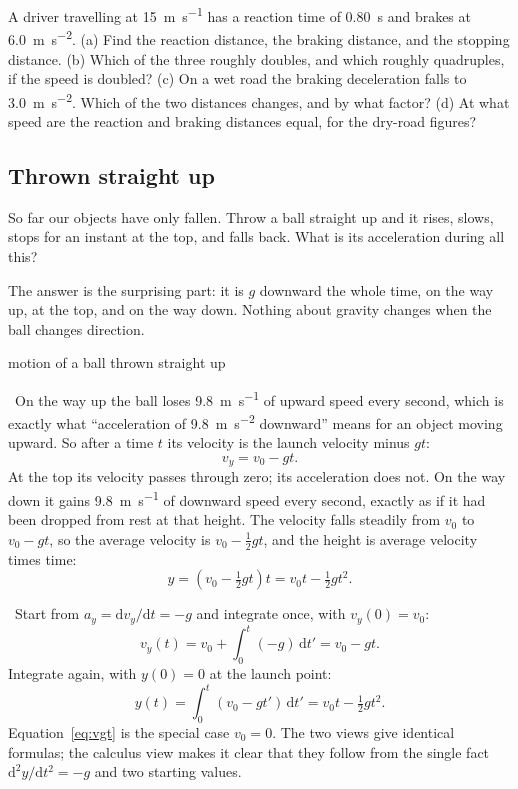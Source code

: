 \documentclass[11pt,twoside,openany]{book}
\newcommand{\dd}{\mathrm{d}}
\newcounter{check}[chapter]
\newcommand{\viewtag}[3]{\fcolorbox{#2}{#3}{\footnotesize\textbf{\textcolor{#2}{#1}}}}
\newcommand{\elemtag}{\viewtag{Elementary}{elemcol}{elempale}}
\newcommand{\calctag}{\viewtag{Calculus}{calccol}{calcpale}}
\newcommand{\elem}{\par\medskip\noindent\elemtag\ }
\newcommand{\calc}{\par\medskip\noindent\calctag\ }
\begin{document}
\begin{checkbox}
A driver travelling at \SI{15}{\metre\per\second} has a reaction time of \SI{0.80}{\second} and brakes at \SI{6.0}{\metre\per\second\squared}. (a) Find the reaction distance, the braking distance, and the stopping distance. (b) Which of the three roughly doubles, and which roughly quadruples, if the speed is doubled? (c) On a wet road the braking deceleration falls to \SI{3.0}{\metre\per\second\squared}. Which of the two distances changes, and by what factor? (d) At what speed are the reaction and braking distances equal, for the dry-road figures?
\end{checkbox}

\subsection{Thrown straight up}

So far our objects have only fallen. Throw a ball straight up and it rises, slows, stops for an instant at the top, and falls back. What is its acceleration during all this?

The answer is the surprising part: it is $g$ downward the whole time, on the way up, at the top, and on the way down. Nothing about gravity changes when the ball changes direction.

\begin{twoviews}{motion of a ball thrown straight up}
\elem On the way up the ball loses \SI{9.8}{\metre\per\second} of upward speed every second, which is exactly what ``acceleration of \SI{9.8}{\metre\per\second\squared} downward'' means for an object moving upward. So after a time $t$ its velocity is the launch velocity minus $gt$:
\[
v_y = v_0 - g t.
\]
At the top its velocity passes through zero; its acceleration does not. On the way down it gains \SI{9.8}{\metre\per\second} of downward speed every second, exactly as if it had been dropped from rest at that height. The velocity falls steadily from $v_0$ to $v_0 - gt$, so the average velocity is $v_0 - \tfrac12 gt$, and the height is average velocity times time:
\[
y = \left(v_0 - \tfrac12 g t\right) t = v_0 t - \tfrac12 g t^2.
\]

\calc Start from $a_y = \dd v_y/\dd t = -g$ and integrate once, with $v_y(0) = v_0$:
\begin{equation}
v_y(t) = v_0 + \int_0^t (-g)\,\dd t' = v_0 - g t.
\label{eq:thrown}
\end{equation}
Integrate again, with $y(0) = 0$ at the launch point:
\begin{equation}
y(t) = \int_0^t (v_0 - g t')\,\dd t' = v_0 t - \tfrac12 g t^2.
\label{eq:thrown2}
\end{equation}
Equation~\eqref{eq:vgt} is the special case $v_0 = 0$. The two views give identical formulas; the calculus view makes it clear that they follow from the single fact $\dd^2 y/\dd t^2 = -g$ and two starting values.
\end{twoviews}
\end{document}
